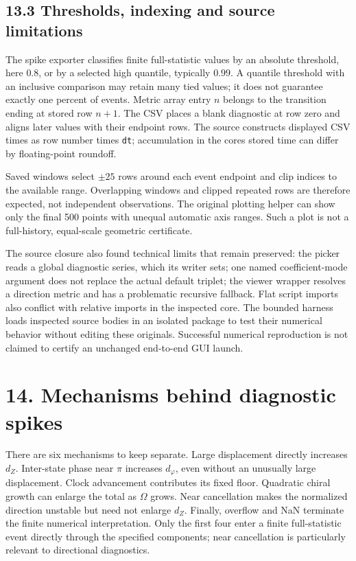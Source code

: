 \documentclass[
  11pt,
  a4paper,
]{article}
\begin{document}
\subsection{13.3 Thresholds, indexing and source limitations}\label{thresholds-indexing-and-source-limitations}

The spike exporter classifies finite full-statistic values by an absolute threshold, here \(0.8\), or by a selected high quantile, typically \(0.99\). A quantile threshold with an inclusive comparison may retain many tied values; it does not guarantee exactly one percent of events. Metric array entry \(n\) belongs to the transition ending at stored row \(n+1\). The CSV places a blank diagnostic at row zero and aligns later values with their endpoint rows. The source constructs displayed CSV times as row number times \texttt{dt}; accumulation in the core\textquotesingle s stored time can differ by floating-point roundoff.

Saved windows select \(\pm25\) rows around each event endpoint and clip indices to the available range. Overlapping windows and clipped repeated rows are therefore expected, not independent observations. The original plotting helper can show only the final 500 points with unequal automatic axis ranges. Such a plot is not a full-history, equal-scale geometric certificate.

The source closure also found technical limits that remain preserved: the picker reads a global diagnostic series, which its writer sets; one named coefficient-mode argument does not replace the actual default triplet; the viewer wrapper resolves a direction metric and has a problematic recursive fallback. Flat script imports also conflict with relative imports in the inspected core. The bounded harness loads inspected source bodies in an isolated package to test their numerical behavior without editing these originals. Successful numerical reproduction is not claimed to certify an unchanged end-to-end GUI launch.

\section{14. Mechanisms behind diagnostic spikes}\label{mechanisms-behind-diagnostic-spikes}

There are six mechanisms to keep separate. Large displacement directly increases \(d_Z\). Inter-state phase near \(\pi\) increases \(d_\varphi\), even without an unusually large displacement. Clock advancement contributes its fixed floor. Quadratic chiral growth can enlarge the total as \(\Omega\) grows. Near cancellation makes the normalized direction unstable but need not enlarge \(d_Z\). Finally, overflow and NaN terminate the finite numerical interpretation. Only the first four enter a finite full-statistic event directly through the specified components; near cancellation is particularly relevant to directional diagnostics.
\end{document}
